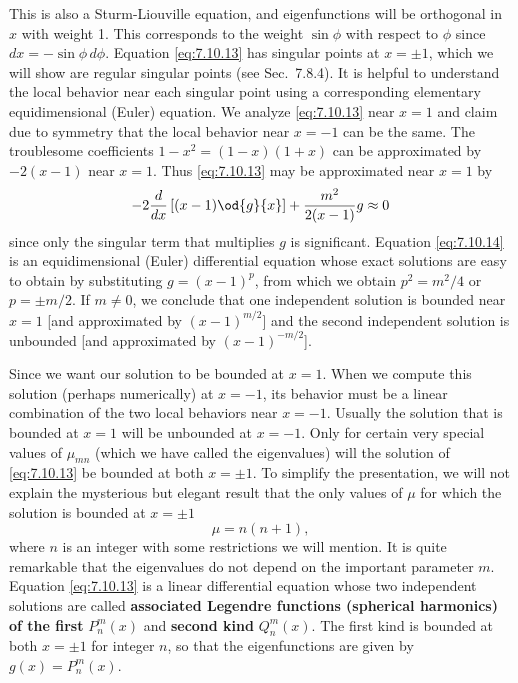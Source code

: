 This is also a Sturm-Liouville equation, and eigenfunctions will be orthogonal in $x$ with weight 1.  This corresponds to the weight $\sin\phi$ with respect to $\phi$ since $dx = -\sin\phi\,d\phi$.  Equation \eqref{eq:7.10.13} has singular points at $x = \pm 1$, which we will show are regular singular points (see Sec.~7.8.4).  It is helpful to understand the local behavior near each singular point using a corresponding elementary equidimensional (Euler) equation.  We analyze \eqref{eq:7.10.13} near $x = 1$ and claim due to symmetry that the local behavior near $x = -1$ can be the same.  The troublesome coefficients $1 - x^2 = (1-x)(1+x)$ can be approximated by $-2(x-1)$ near $x = 1$.  Thus \eqref{eq:7.10.13} may be approximated near $x = 1$ by
\begin{equation}
-2\frac{d}{d x}\left[(x-1)\od{g}{x}\right] + \frac{m^2}{2(x-1)}g \approx 0
\label{eq:7.10.14}
\end{equation}
since only the singular term that multiplies $g$ is significant.  Equation \eqref{eq:7.10.14} is an equidimensional (Euler) differential equation whose exact solutions are easy to obtain by substituting $g = (x - 1)^p$, from which we obtain $p^2 = m^2/4$ or $p = \pm m/2$.  If $m \neq 0$, we conclude that one independent solution is bounded near $x = 1$ [and approximated by $(x-1)^{m/2}$] and the second independent solution is unbounded [and approximated by $(x-1)^{-m/2}$].

Since we want our solution to be bounded at $x = 1$.  When we compute this solution (perhaps numerically) at $x = -1$, its behavior must be a linear combination of the two local behaviors near $x = -1$.  Usually the solution that is bounded at $x = 1$ will be unbounded at $x = -1$.  Only for certain very special values of $\mu_{mn}$ (which we have called the eigenvalues) will the solution of \eqref{eq:7.10.13} be bounded at both $x = \pm 1$.  To simplify the presentation, we will not explain the mysterious but elegant result that the only values of $\mu$ for which the solution is bounded at $x = \pm 1$
\begin{equation}
\mu = n(n+1),
\label{eq:7.10.15}
\end{equation}
where $n$ is an integer with some restrictions we will mention.  It is quite remarkable that the eigenvalues do not depend on the important parameter $m$.  Equation \eqref{eq:7.10.13} is a linear differential equation whose two independent solutions are called \textbf{associated Legendre functions (spherical harmonics) of the first} $P_n^m(x)$ and \textbf{second kind} $Q_n^m(x)$.  The first kind is bounded at both $x = \pm 1$ for integer $n$, so that the eigenfunctions are given by $g(x) = P_n^m(x)$.

